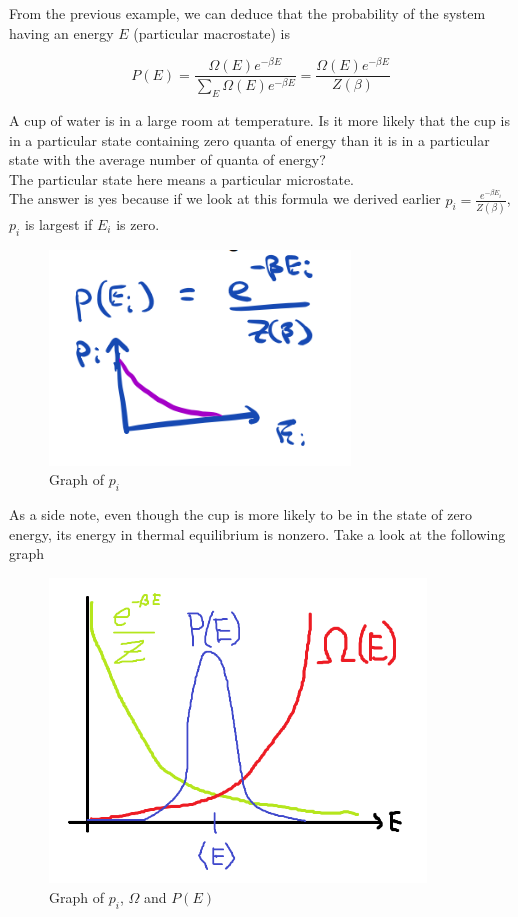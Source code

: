 \documentclass[12pt, a4paper]{article}
\newcounter{exa}
\begin{document}
From the previous example, we can deduce that the probability of the system having an energy $E$ (particular macrostate) is

$$P(E)=\frac{\Omega(E)e^{-\beta E}}{\sum_E \Omega(E)e^{-\beta E}}=\frac{\Omega(E)e^{-\beta E}}{Z(\beta)}$$

\begin{texample}
A cup of water is in a large room at temperature. Is it more likely that the cup is in a particular state
containing zero quanta of energy than it is in a particular state with the average number of quanta of energy? \\

The particular state here means a particular microstate. \\

The answer is yes because if we look at this formula we derived earlier $p_i=\frac{e^{-\beta E_i}}{Z(\beta)}$, $p_i$ is largest if $E_i$ is zero.

\begin{figure}[H]
\centering
\includegraphics[width=80mm]{16.png}
\caption{Graph of $p_i$}
\end{figure}

As a side note, even though the cup is more likely to be in the state of zero energy, its energy in thermal equilibrium is nonzero. Take a look at the following graph

\begin{figure}[H]
\centering
\includegraphics[width=100mm]{17.png}
\caption{Graph of $p_i$, $\Omega$ and $P(E)$}
\end{figure}


\end{texample}
\end{document}
